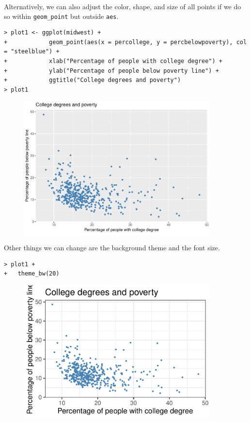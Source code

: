 Alternatively, we can also adjust the color, shape, and size of all points if we do so within \texttt{geom\_point} but outside \texttt{aes}.

\begin{lstlisting}
> plot1 <- ggplot(midwest) +
+            geom_point(aes(x = percollege, y = percbelowpoverty), col = "steelblue") +            
+            xlab("Percentage of people with college degree") +
+            ylab("Percentage of people below poverty line") +
+            ggtitle("College degrees and poverty")
> plot1
\end{lstlisting}

\begin{figure}[h]
\centering
\includegraphics[width=4in]{plots/06.pdf} 
\end{figure}

Other things we can change are the background theme and the font size.

\begin{lstlisting}
> plot1 + 
+   theme_bw(20)
\end{lstlisting}

\begin{figure}[h]
\centering
\includegraphics[width=4in]{plots/07.pdf} 
\end{figure}

